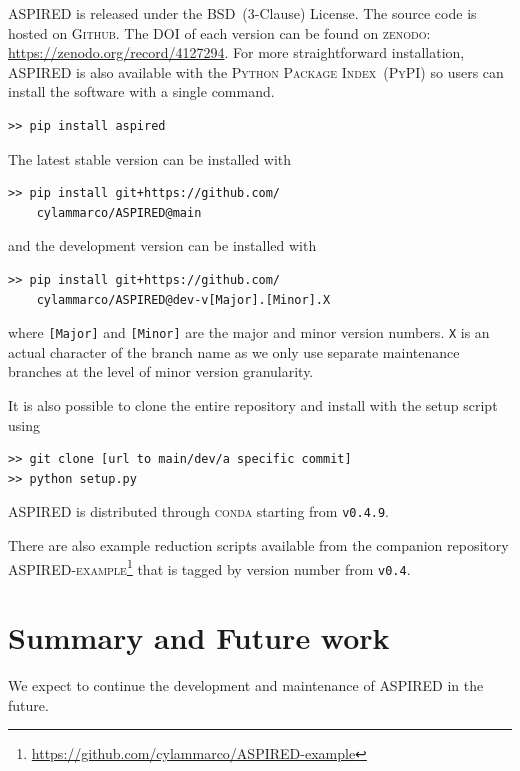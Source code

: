 \documentclass[linenumbers, twocolumn]{aastex631}
\begin{document}
\textsc{ASPIRED} is released under the BSD~(3-Clause) License. The source code
is hosted on \textsc{Github}. The DOI of each version can be found on 
\textsc{zenodo}: \url{https://zenodo.org/record/4127294}. For more
straightforward installation, \textsc{ASPIRED} is also available with the
\textsc{Python Package Index}~(\textsc{PyPI}) so users can install the software with a single command. 
\begin{verbatim}
>> pip install aspired
\end{verbatim}
The latest stable version can be installed with
\begin{verbatim}
>> pip install git+https://github.com/
    cylammarco/ASPIRED@main
\end{verbatim}
and the development version can be installed with 
\begin{verbatim}
>> pip install git+https://github.com/
    cylammarco/ASPIRED@dev-v[Major].[Minor].X
\end{verbatim} where \verb+[Major]+ and \verb+[Minor]+ are the major and minor
version numbers. \verb+X+ is an actual character of the branch name as we only
use separate maintenance branches at the level of minor version granularity.

It is also possible to clone the entire repository
and install with the setup script using
\begin{verbatim}
>> git clone [url to main/dev/a specific commit]
>> python setup.py
\end{verbatim}
ASPIRED is distributed through \textsc{conda} starting from \texttt{v0.4.9}.

There are also example reduction scripts available from the companion repository
\textsc{ASPIRED-example}\footnote{\url{https://github.com/cylammarco/ASPIRED-example}}
that is tagged by version number from \texttt{v0.4}.


\section{Summary and Future work}
\label{sec:summary}

We expect to continue the development and maintenance of \textsc{ASPIRED} in the
future. 
\end{document}
